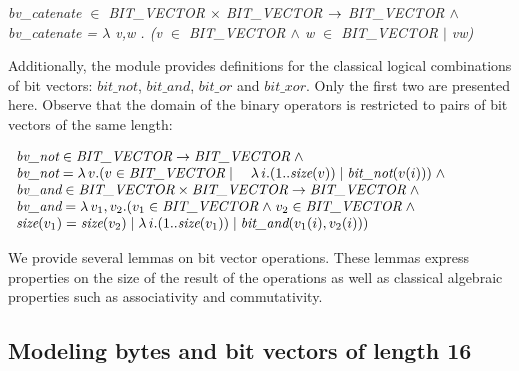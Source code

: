 \documentclass[a4paper]{llncs}
\begin{document}
\hspace*{0.00in} \it bv\_catenate  $\in$  \it BIT\_VECTOR  $\times$  \it BIT\_VECTOR  $\rightarrow$ \it
BIT\_VECTOR $\land$\\
\hspace*{0.21in} \it bv\_catenate \rm =  $\lambda$  v\rm ,\it w \rm . \rm (\it v 
$\in$  \it BIT\_VECTOR $\land$ \it w $\in$  \it BIT\_VECTOR  $\mid$  \it v\^ \it w\rm ) %

%
%


Additionally, the module provides definitions for the classical
logical combinations of bit vectors: $\textit{bit\_not}$,
$\textit{bit\_and}$, $\textit{bit\_or}$ and $\textit{bit\_xor}$. Only
the first two are presented here. Observe that the domain of the
binary operators is restricted to pairs of bit vectors of the same
length:

$
\begin{array}{l}
\textit{bv\_not} \in \textit{BIT\_VECTOR} \fun \textit{BIT\_VECTOR} \land \\
\textit{bv\_not} = \lambda v . (v \in \textit{BIT\_VECTOR} \mid \quad \lambda i . (1 .. \textit{size}(v)) \mid \textit{bit\_not}(v(i))) \land \\
\textit{bv\_and} \in \textit{BIT\_VECTOR} \times \textit{BIT\_VECTOR} \fun \textit{BIT\_VECTOR} \land \\
\textit{bv\_and} = \lambda v_1, v_2 . (v_1 \in \textit{BIT\_VECTOR} \land v_2 \in \textit{BIT\_VECTOR} \land \\
\textit{size}(v_1) = \textit{size}(v_2) \mid \lambda i . (1 .. \textit{size}(v_1)) \mid
\textit{bit\_and}(v_1(i), v_2(i)))
\end{array}
$

We provide several lemmas on bit vector operations. These lemmas
express properties on the size of the result of the operations
as well as classical algebraic properties such as associativity
and commutativity.

\subsection{Modeling bytes and bit vectors of length 16}
\label{subsec:HardwareLibrary3}
\end{document}
